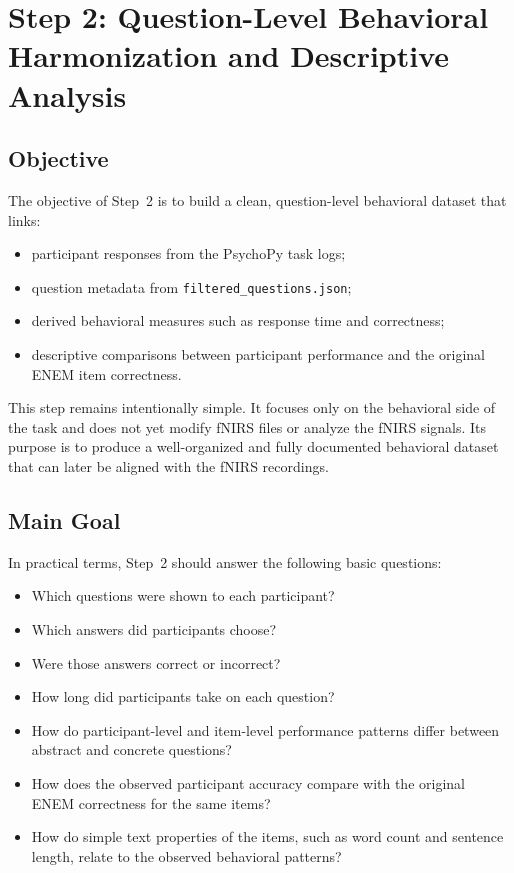 \documentclass[11pt]{article}
\begin{document}
\sloppy
\section{Step 2: Question-Level Behavioral Harmonization and Descriptive Analysis}
\label{sec:step2_behavior}

\subsection{Objective}
The objective of Step~2 is to build a clean, question-level behavioral dataset that links:
\begin{itemize}
    \item participant responses from the PsychoPy task logs;
    \item question metadata from \texttt{filtered\_questions.json};
    \item derived behavioral measures such as response time and correctness;
    \item descriptive comparisons between participant performance and the original ENEM item correctness.
\end{itemize}

This step remains intentionally simple.
It focuses only on the behavioral side of the task and does not yet modify fNIRS files or analyze the fNIRS signals.
Its purpose is to produce a well-organized and fully documented behavioral dataset that can later be aligned with the fNIRS recordings.

\subsection{Main Goal}
In practical terms, Step~2 should answer the following basic questions:
\begin{itemize}
    \item Which questions were shown to each participant?
    \item Which answers did participants choose?
    \item Were those answers correct or incorrect?
    \item How long did participants take on each question?
    \item How do participant-level and item-level performance patterns differ between abstract and concrete questions?
    \item How does the observed participant accuracy compare with the original ENEM correctness for the same items?
    \item How do simple text properties of the items, such as word count and sentence length, relate to the observed behavioral patterns?
\end{itemize}
\end{document}

